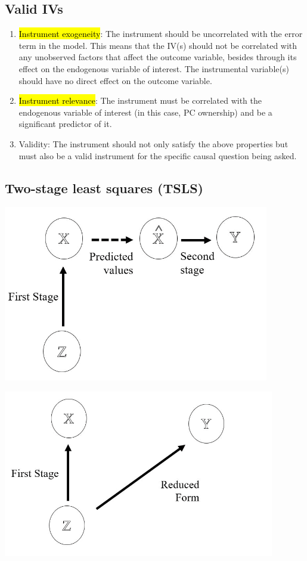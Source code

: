 \documentclass[a3paper, 8pt]{extarticle}
\begin{document}
\begin{multicols*}{5}
\subsection{Valid IVs}


\begin{enumerate}
    \item \hl{Instrument exogeneity}:
    The instrument should be uncorrelated with the error term in the model. This means that the IV(s) should not be correlated with any unobserved factors that affect the outcome variable, besides through its effect on the endogenous variable of interest. The instrumental variable(s) should have no direct effect on the outcome variable.
    \item \hl{Instrument relevance}: The instrument must be correlated with the endogenous variable of interest (in this case, PC ownership) and be a significant predictor of it.
    \item Validity: The instrument should not only satisfy the above properties but must also be a valid instrument for the specific causal question being asked.
\end{enumerate}

\subsection{Two-stage least squares (TSLS)}
\includegraphics[width = 0.9 \columnwidth]{Screen Shot 2023-03-31 at 16.46.45.png}

\includegraphics[width = 0.9 \columnwidth]{Screen Shot 2023-03-31 at 16.46.54.png}



\end{multicols*}
\end{document}
